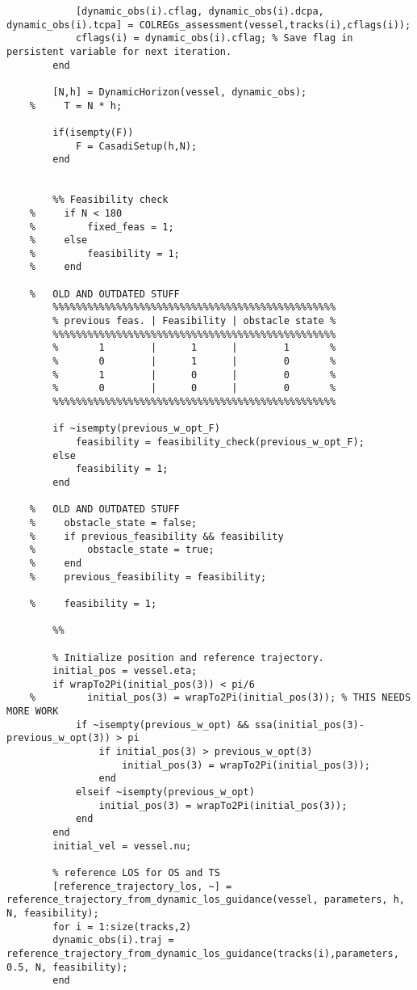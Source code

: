 \begin{lstlisting}
            [dynamic_obs(i).cflag, dynamic_obs(i).dcpa, dynamic_obs(i).tcpa] = COLREGs_assessment(vessel,tracks(i),cflags(i));
            cflags(i) = dynamic_obs(i).cflag; % Save flag in persistent variable for next iteration.
        end
    
        [N,h] = DynamicHorizon(vessel, dynamic_obs);
    %     T = N * h;
    
        if(isempty(F))
            F = CasadiSetup(h,N);
        end
        
        
        %% Feasibility check
    %     if N < 180
    %         fixed_feas = 1;
    %     else
    %         feasibility = 1;
    %     end
        
    %   OLD AND OUTDATED STUFF
        %%%%%%%%%%%%%%%%%%%%%%%%%%%%%%%%%%%%%%%%%%%%%%%%%
        % previous feas. | Feasibility | obstacle state %
        %%%%%%%%%%%%%%%%%%%%%%%%%%%%%%%%%%%%%%%%%%%%%%%%%
        %       1        |      1      |        1       %
        %       0        |      1      |        0       %
        %       1        |      0      |        0       %
        %       0        |      0      |        0       %
        %%%%%%%%%%%%%%%%%%%%%%%%%%%%%%%%%%%%%%%%%%%%%%%%%
        
        if ~isempty(previous_w_opt_F)
            feasibility = feasibility_check(previous_w_opt_F);
        else
            feasibility = 1;
        end
    
    %   OLD AND OUTDATED STUFF    
    %     obstacle_state = false;    
    %     if previous_feasibility && feasibility
    %         obstacle_state = true;
    %     end
    %     previous_feasibility = feasibility;
    
    %     feasibility = 1;
    
        %%
        
        % Initialize position and reference trajectory.
        initial_pos = vessel.eta;
        if wrapTo2Pi(initial_pos(3)) < pi/6
    %         initial_pos(3) = wrapTo2Pi(initial_pos(3)); % THIS NEEDS MORE WORK
            if ~isempty(previous_w_opt) && ssa(initial_pos(3)-previous_w_opt(3)) > pi
                if initial_pos(3) > previous_w_opt(3)
                    initial_pos(3) = wrapTo2Pi(initial_pos(3));
                end
            elseif ~isempty(previous_w_opt)
                initial_pos(3) = wrapTo2Pi(initial_pos(3));
            end
        end
        initial_vel = vessel.nu;
    
        % reference LOS for OS and TS
        [reference_trajectory_los, ~] = reference_trajectory_from_dynamic_los_guidance(vessel, parameters, h, N, feasibility);
        for i = 1:size(tracks,2)
        dynamic_obs(i).traj = reference_trajectory_from_dynamic_los_guidance(tracks(i),parameters, 0.5, N, feasibility);
        end
        

\end{lstlisting}
